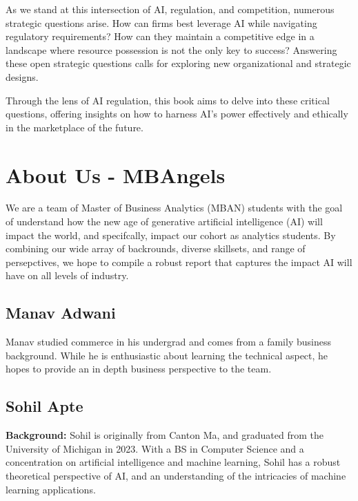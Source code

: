 \documentclass[
]{book}
\begin{document}
As we stand at this intersection of AI, regulation, and competition, numerous strategic questions arise. How can firms best leverage AI while navigating regulatory requirements? How can they maintain a competitive edge in a landscape where resource possession is not the only key to success? Answering these open strategic questions calls for exploring new organizational and strategic designs.

Through the lens of AI regulation, this book aims to delve into these critical questions, offering insights on how to harness AI's power effectively and ethically in the marketplace of the future.

\hypertarget{about-us---mbangels}{%
\chapter{About Us - MBAngels}\label{about-us---mbangels}}

We are a team of Master of Business Analytics (MBAN) students with the goal of understand how the new age of generative artificial intelligence (AI) will impact the world, and specifcally, impact our cohort as analytics students. By combining our wide array of backrounds, diverse skillsets, and range of persepctives, we hope to compile a robust report that captures the impact AI will have on all levels of industry.

\hypertarget{manav-adwani}{%
\section{Manav Adwani}\label{manav-adwani}}

Manav studied commerce in his undergrad and comes from a family business background. While he is enthusiastic about learning the technical aspect, he hopes to provide an in depth business perspective to the team.

\hypertarget{sohil-apte}{%
\section{Sohil Apte}\label{sohil-apte}}

\textbf{Background:}
Sohil is originally from Canton Ma, and graduated from the University of Michigan in 2023. With a BS in Computer Science and a concentration on artificial intelligence and machine learning, Sohil has a robust theoretical perspective of AI, and an understanding of the intricacies of machine learning applications.
\end{document}
